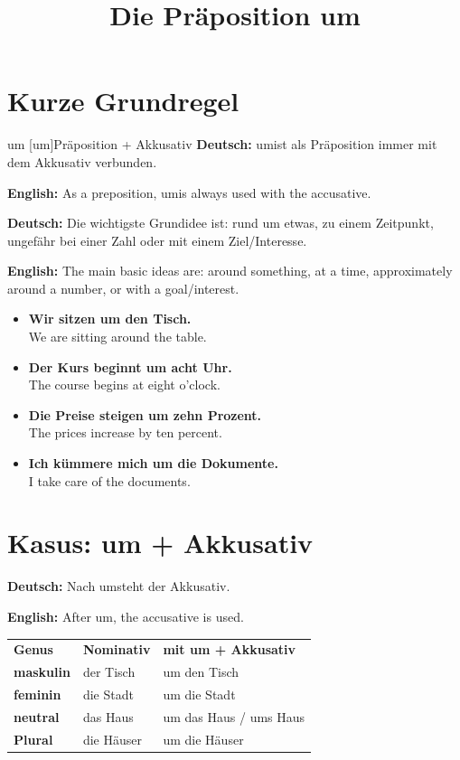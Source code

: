 \documentclass[a4paper,11pt]{article}
\title{Die Präposition \glqq um\grqq}
\date{}
\newcommand{\GermanText}[1]{\textbf{Deutsch: }#1\par}
\newcommand{\EnglishText}[1]{{\small\color{SoftGray}\textbf{English: }#1\par}}
\newcommand{\ExampleItem}[2]{\item \textbf{#1}\\{\small\color{SoftGray}#2}}
\begin{document}
    \maketitle
    \tableofcontents
    \newpage

\section{Kurze Grundregel}

\begin{grammarentry}{um [um]}{Präposition + Akkusativ}
\GermanText{\glqq um\grqq ist als Präposition immer mit dem Akkusativ verbunden.}
\EnglishText{As a preposition, \glqq um\grqq is always used with the accusative.}

\GermanText{Die wichtigste Grundidee ist: rund um etwas, zu einem Zeitpunkt, ungefähr bei einer Zahl oder mit einem Ziel/Interesse.}
\EnglishText{The main basic ideas are: around something, at a time, approximately around a number, or with a goal/interest.}
\end{grammarentry}

\begin{exbox}
\begin{itemize}
    \ExampleItem{Wir sitzen um den Tisch.}{We are sitting around the table.}
    \ExampleItem{Der Kurs beginnt um acht Uhr.}{The course begins at eight o'clock.}
    \ExampleItem{Die Preise steigen um zehn Prozent.}{The prices increase by ten percent.}
    \ExampleItem{Ich kümmere mich um die Dokumente.}{I take care of the documents.}
\end{itemize}
\end{exbox}

\section{Kasus: um + Akkusativ}

\GermanText{Nach \glqq um\grqq steht der Akkusativ.}
\EnglishText{After \glqq um\grqq, the accusative is used.}

\begin{tabularx}{\textwidth}{>{\bfseries}p{}X X}
\rowcolor{HeaderBlueDark}
\color{white}\textbf{Genus} & \color{white}\textbf{Nominativ} & \color{white}\textbf{mit um + Akkusativ} \\
maskulin & der Tisch & um den Tisch \\
feminin & die Stadt & um die Stadt \\
neutral & das Haus & um das Haus / ums Haus \\
Plural & die Häuser & um die Häuser \\
\end{tabularx}
\end{document}
